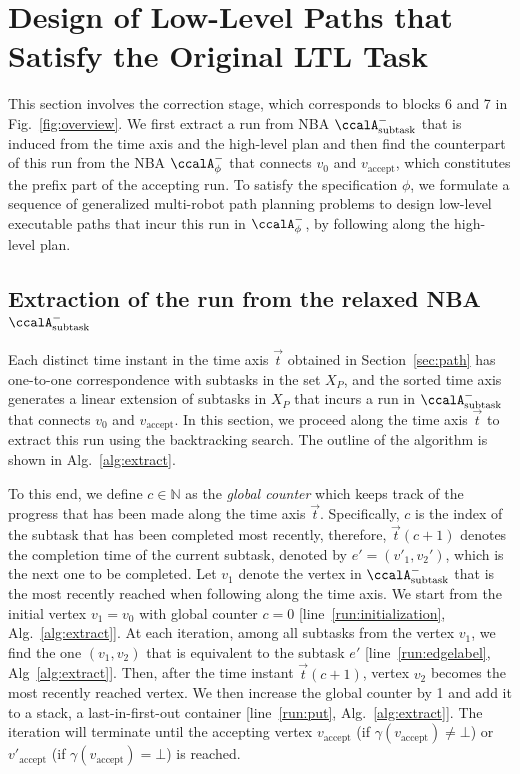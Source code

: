 \documentclass[Afour,sageh,times]{sagej}
\newcommand{\auto}[1]{\ccalA_{\text{#1}}}
\newcommand{\autop}{\ccalA_{\phi}}
\begin{document}
{  \section{Design of Low-Level Paths that Satisfy the Original LTL Task}\label{sec:solution2mrta}
 This section involves the correction stage, which corresponds to blocks 6 and 7 in Fig.~\ref{fig:overview}. We first extract a run from NBA $\auto{subtask}^-$ that is induced from the time axis and the high-level plan and then find the counterpart of this run from the NBA $\autop^-$ that connects $v_0$ and $v_{\text{accept}}$, which constitutes the prefix part of the accepting run. To satisfy the specification $\phi$, we formulate a sequence of generalized multi-robot path planning problems to design low-level executable paths that incur this run in $\autop^-$, by following along the high-level plan.
\subsection{Extraction of the run from the relaxed NBA \upshape $\auto{subtask}^-$}\label{sec:run}

Each distinct time instant in the time axis $\vec{t}$ obtained in Section~\ref{sec:path} has one-to-one correspondence with subtasks in the set $X_P$, and the sorted time axis generates a linear extension of subtasks in $X_P$ that incurs a run in $\auto{subtask}^-$ that connects $v_{0}$ and $v_{\text{accept}}$. In this section, we proceed along the time axis $\vec{t}$ to extract this run using the backtracking search. The outline of the algorithm is shown in Alg.~\ref{alg:extract}.

  To this end, we define $c\in \mathbb{N}$ as the {\it global counter} which keeps track of the progress that has been made along the time axis $\vec{t}$. Specifically, $c$ is the index of the subtask that  has  been completed most recently, therefore, $\vec{t}(c+1)$ denotes  the  completion time of the current subtask, denoted by $e' = (v'_1, v_2')$, which is  the next one to be completed. Let $v_1$ denote the vertex in $\auto{subtask}^-$ that is the  most recently reached when following along the time axis.  We start from the initial vertex $v_1= v_0$ with global counter $c=0$ [line~\ref{run:initialization}, Alg.~\ref{alg:extract}]. At each iteration, among all subtasks from the vertex $v_1$, we find the one $(v_1, v_2)$ that is  equivalent to the  subtask $e'$ [line~\ref{run:edgelabel}, Alg~\ref{alg:extract}]. Then, after the time instant $\vec{t}(c+1)$,  vertex $v_2$ becomes the most recently reached vertex. We then increase the global counter by 1 and add it to a stack, a last-in-first-out container [line~\ref{run:put}, Alg.~\ref{alg:extract}]. The iteration will terminate until the accepting vertex $v_{\text{accept}}$ (if $\gamma(v_{\text{accept}}) \neq \bot$) or $v'_{\text{accept}}$ (if $\gamma(v_{\text{accept}}) = \bot$) is reached.


}
\end{document}
